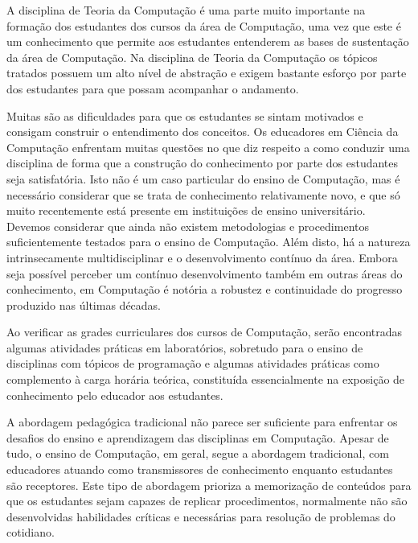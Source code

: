\newcommand{\publicacaoTemplate}[2]{%
\textbf{#1} : #2}


\acresetall
\label{cap-introducao}
A disciplina de Teoria da Computação é uma parte muito importante
na formação dos estudantes dos cursos da área de Computação, uma 
vez que este é um conhecimento que permite aos estudantes
entenderem as bases de sustentação da área de Computação.
Na disciplina de Teoria da Computação os tópicos tratados
possuem um alto nível de abstração e exigem bastante esforço
por parte dos estudantes para que possam acompanhar o
andamento.

Muitas são as dificuldades para que os estudantes se sintam
motivados e consigam construir o entendimento dos conceitos.
Os educadores em Ciência da Computação enfrentam muitas questões no que diz
respeito a como conduzir uma disciplina de forma que a construção do conhecimento
por parte dos estudantes seja satisfatória.
Isto não é um caso particular do ensino de Computação,
mas é necessário considerar que se trata de
conhecimento relativamente novo, e que só muito
recentemente está presente em instituições de ensino universitário.
Devemos considerar que ainda não existem metodologias e procedimentos
suficientemente testados para o ensino de Computação.
Além disto, há a natureza intrinsecamente multidisciplinar e
o desenvolvimento contínuo da área.
Embora seja possível perceber um contínuo desenvolvimento também em
outras áreas do conhecimento, em Computação é notória a robustez e
continuidade do progresso produzido nas últimas décadas.

Ao verificar as grades curriculares dos cursos de Computação,
serão encontradas algumas atividades práticas em laboratórios,
sobretudo para o ensino de disciplinas com tópicos de programação e
algumas atividades práticas como complemento à carga horária teórica,
constituída essencialmente na exposição de conhecimento pelo educador
aos estudantes.

A abordagem pedagógica tradicional não parece ser suficiente para enfrentar
os desafios do ensino e aprendizagem das disciplinas
em Computação.
Apesar de tudo, o ensino de Computação, em geral, segue a abordagem
tradicional, com educadores atuando como transmissores de conhecimento
enquanto estudantes são receptores.
Este tipo de abordagem prioriza a memorização de conteúdos para
que os estudantes sejam capazes de replicar procedimentos,
normalmente não são desenvolvidas habilidades críticas e
necessárias para resolução de problemas do cotidiano.

